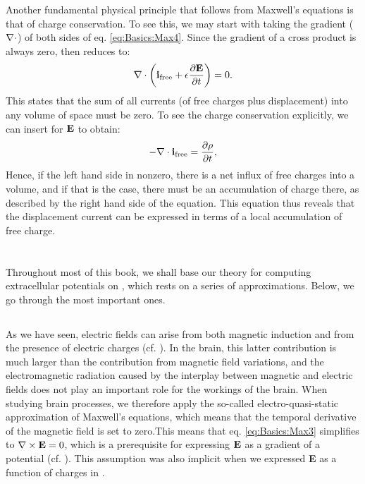 Another fundamental physical principle that follows from Maxwell's equations is that of charge conservation. To see this, we may start with taking the gradient (${\bf \nabla} \cdot$) of both sides of eq. \ref{eq:Basics:Max4}. 
Since the gradient of a cross product is always zero,  then reduces to:
\begin{equation}
{\bf \nabla} \cdot \left( {\bf i}_\text{free} +  \epsilon \frac{\partial {\bf E}}{\partial t} \right) = 0.
\label{eq:Basics:Max4dot}
\end{equation}
This states that the sum of all currents (of free charges plus displacement) into any volume of space must be zero. To see the charge conservation explicitly, we can insert  for ${\bf E}$ to obtain:
\begin{equation}
- {\bf \nabla} \cdot {\bf i}_\text{free} =  \frac{\partial \rho}{\partial t},
\label{eq:Basics:currentconservation}
\end{equation}
Hence, if the left hand side in nonzero, there is a net influx of free charges into a volume, and if that is the case, there must be an accumulation of charge there, as described by the right hand side of the equation. This equation thus reveals that the displacement current can be expressed in terms of a local accumulation of free charge.


\section{}
Throughout most of this book, we shall base our theory for computing extracellular potentials on , which rests on a series of approximations. Below, we go through the most important ones. 


\subsection{}
\label{sec:Basics:Quasielectrostatic} 
As we have seen, electric fields can arise from both magnetic induction and from the presence of electric charges (cf. ). In the brain, this latter contribution is much larger than the contribution from magnetic field variations, and the electromagnetic radiation caused by the interplay between magnetic and electric fields does not play an important role for the workings of the brain. When studying brain processes, we therefore apply the so-called electro-quasi-static approximation of Maxwell's equations, which means that the temporal derivative of the magnetic field is set to zero.This means that eq. \ref{eq:Basics:Max3} simplifies to ${\bf \nabla} \times {\bf E} = 0$, which is a prerequisite for expressing ${\bf E}$ as a gradient of a potential (cf. ). This assumption was also implicit when we expressed {\bf E} as a function of charges in .



